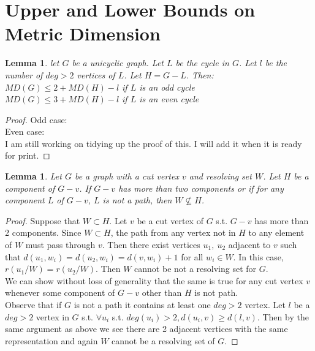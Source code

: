 \documentclass[11pt]{amsart}
\theoremstyle{plain}  %
\newtheorem{lem}[thm]{Lemma}
\theoremstyle{definition}
\theoremstyle{remark}
\numberwithin{equation}{thm}
\begin{document}
\section{Upper and Lower Bounds on Metric Dimension}

\begin{lem}
 let $G$ be a unicyclic graph. Let $L$ be the cycle in $G$. Let $l$ be the number of $deg > 2$ vertices of $L$. 
 Let $H = G-L$. Then:\\ 
 $MD(G) \leq 2 + MD(H) -l$ if $L$ is an odd cycle\\
 $MD(G) \leq 3 + MD(H) -l$ if $L$ is an even cycle
\end{lem}
\begin{proof}
Odd case: \\
Even case: \\
  I am still working on tidying up the proof of this. I will add it when it is ready for print.
\end{proof}

 
\begin{lem}
 Let $G$ be a graph with a cut vertex $v$ and resolving set $W$. Let $H$ be a component of $G-v$. 
 If $G-v$ has more than two components or if for any component $L$ of $G-v$, $L$ is not a path, then $W\nsubseteq H$.
\end{lem}
\begin{proof}
 Suppose that $W \subset H$. 
 Let $v$ be a cut vertex of $G$ s.t. $G-v$ has more than 2 components. Since $W \subset H$, the path from any vertex not in $H$ to any element of $W$ must pass through $v$.
 Then there exist vertices $u_1,\ u_2$ adjacent to $v$ such that $d(u_1, w_i) = d(u_2, w_i) = d(v, w_i) + 1$ for all $w_i \in W$.
 In this case, $r(u_1/W) = r(u_2/W)$. Then $W$ cannot be not a resolving set for $G$.\\
 We can show without loss of generality that the same is true for any cut vertex $v$ whenever some component of $G-v$ other than $H$ is not path.\\
 Observe that if $G$ is not a path it contains at least one $deg > 2$ vertex. 
 Let $l$ be a $deg > 2$ vertex in $G$ s.t. $\forall u_i$ s.t. $deg(u_i)>2, d(u_i, v) \geq d(l, v)$. 
 Then by the same argument as above we see there are 2 adjacent vertices with the same representation and again $W$ cannot be a resolving set of $G$.
 \end{proof}
\end{document}
